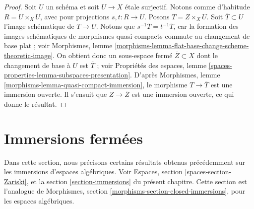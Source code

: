\begin{proof}
Soit $U$ un schéma et soit $U \to X$ \'etale surjectif.
Notons comme d'habitude $R = U \times_X U$, avec pour projections
$s, t : R \to U$. Posons $T = Z \times_X U$. Soit $\overline{T} \subset U$
l'image schématique de $T \to U$. Notons que
$s^{-1}\overline{T} = t^{-1}\overline{T}$, car la formation des
images schématiques de morphismes quasi-compacts commute
au changement de base plat ; voir
Morphismes, lemme \ref{morphisms-lemma-flat-base-change-scheme-theoretic-image}.
On obtient donc un sous-espace fermé $\overline{Z} \subset X$ dont
le changement de base à $U$ est $\overline{T}$ ; voir
Propriétés des espaces, lemme
\ref{spaces-properties-lemma-subspaces-presentation}.
D'après Morphismes, lemme \ref{morphisms-lemma-quasi-compact-immersion},
le morphisme $T \to \overline{T}$
est une immersion ouverte. Il s'ensuit que $Z \to \overline{Z}$ est
une immersion ouverte, ce qui donne le résultat.
\end{proof}


















\section{Immersions fermées}
\label{section-closed-immersions}

\noindent
Dans cette section, nous précisons certains résultats obtenus précédemment sur les
immersions d'espaces algébriques. Voir
Espaces, section \ref{spaces-section-Zariski},
et la
section \ref{section-immersions} du présent chapitre.
Cette section est l'analogue de
Morphismes, section \ref{morphisms-section-closed-immersions},
pour les espaces algébriques.

